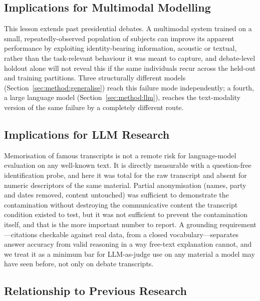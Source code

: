 \documentclass[journal]{IEEEtran}
\begin{document}
\subsection{Implications for Multimodal Modelling}
\label{sec:disc:multimodal}

This lesson extends past presidential debates. A multimodal system trained
on a small, repeatedly-observed population of subjects can improve its
apparent performance by exploiting identity-bearing information, acoustic
or textual, rather than the task-relevant behaviour it was meant to
capture, and debate-level holdout alone will not reveal this if the same
individuals recur across the held-out and training partitions. Three
structurally different models (Section~\ref{sec:method:generalise}) reach
this failure mode independently; a fourth, a large language model
(Section~\ref{sec:method:llm}), reaches the text-modality version of the
same failure by a completely different route.

\subsection{Implications for LLM Research}
\label{sec:disc:llm}

Memorisation of famous transcripts is not a remote risk for
language-model evaluation on any well-known text. It is directly
measurable with a question-free identification probe, and here it was
total for the raw transcript and absent for numeric descriptors of the same
material. Partial anonymisation (names, party and dates removed, content
untouched) was sufficient to demonstrate the contamination without
destroying the communicative content the transcript condition existed to
test, but it was not sufficient to prevent the contamination itself, and
that is the more important number to report. A grounding
requirement---citations checkable against real data, from a closed
vocabulary---separates answer accuracy from valid reasoning in a way
free-text explanation cannot, and we treat it as a minimum bar for
LLM-as-judge use on any material a model may have seen before, not only on
debate transcripts.

\subsection{Relationship to Previous Research}
\label{sec:disc:relationship}
\end{document}
